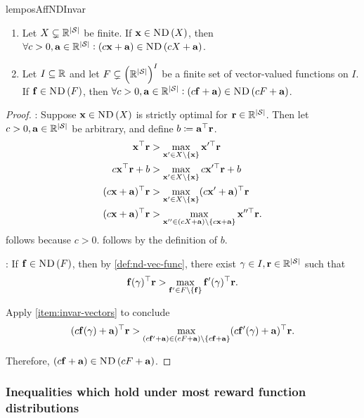 \begin{restatable}{lem}{posAffNDInvar}\label{lem:pos-aff-nd-invar}\hfill
\begin{enumerate}
    \item Let $X\subsetneq \rewardVS$ be finite. If $\x\in \ND{X}$, then $\forall c>0, \av\in\rewardVS: (c\x+\av) \in \ND{cX+\av}$.\label{item:invar-vectors}
    \item Let $I\subseteq \reals$ and let $F\subsetneq \prn{\rewardVS}^I$ be a finite set of vector-valued functions on $I$. If $\f \in \ND{F}$, then $\forall c>0, \av\in\rewardVS: (c\f+\av) \in \ND{cF+\av}$.\label{item:invar-vector-fns}
\end{enumerate}
\end{restatable}
\begin{proof}
: Suppose $\x\in \ND{X}$ is strictly optimal for $\rf\in\rewardVS$. Then let $c>0,\av\in\rewardVS$ be arbitrary, and define $b\defeq \av^\top \rf$. 
\begin{align}
    \x^\top\rf &> \max_{\x'\in X\setminus\set{\x}} \x'^\top \rf\\
    c\x^\top\rf+b &> \max_{\x'\in X\setminus\set{\x}} c\x'^\top \rf+b\label{eq:rescale-c}\\
    (c\x+\av)^\top\rf &> \max_{\x'\in X\setminus\set{\x}} (c\x'+\av)^\top \rf\label{eq:b-defn}\\
    (c\x+\av)^\top\rf &> \max_{\x''\in \prn{cX+\av}\setminus\set{c\x+\av}} \x''^\top \rf.
\end{align}
 follows because $c>0$.  follows by the definition of $b$.

: If $\f\in\ND{F}$, then by \cref{def:nd-vec-func}, there exist $\gamma\in I, \rf\in\rewardVS$ such that
\begin{align}
    \f(\gamma)^\top \rf> \max_{\f'\in F\setminus \set{\f}}\f'(\gamma)^\top \rf.
\end{align}

Apply \cref{item:invar-vectors} to conclude
\begin{align}
    (c\f(\gamma)+\av)^\top \rf> \max_{(c\f'+\av)\in (cF+\av)\setminus \set{c\f+\av}}(c\f'(\gamma)+\av)^\top \rf.
\end{align}

Therefore, $(c\f+\av) \in \ND{cF+\av}$.
\end{proof}

\subsubsection{Inequalities which hold under most reward function distributions}


